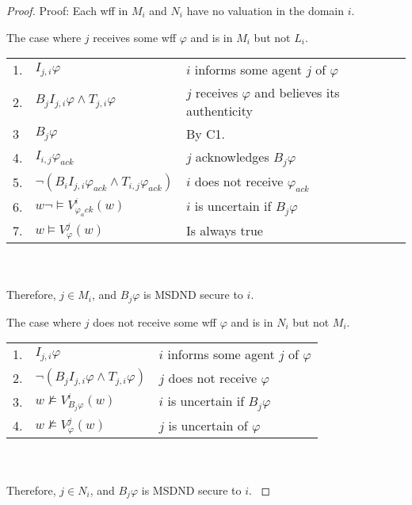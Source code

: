 \begin{proof}
Proof: Each wff in $M_i$ and $N_i$ have no valuation in the domain $i$.

\begin{case}
The case where $j$ receives some wff $\varphi$ and is in $M_i$ but not $L_i$.
\end{case}

\begin{table}[h!]
\centering
\small
\begin{tabularx}{\linewidth}{l l X}
1. & $I_{j,i} \varphi$ & $i$ informs some agent $j$ of $\varphi$ \\
2. & $B_{j}I_{j,i} \varphi \wedge T_{j,i} \varphi$ & $j$ receives $\varphi$ and believes its authenticity \\
3  & $B_j \varphi$ & By C1. \\
4. & $I_{i,j} \varphi_{ack}$ & $j$ acknowledges $B_j \varphi$ \\
5. & $\neg(B_{i}I_{j,i} \varphi_{ack} \wedge T_{i,j} \varphi_{ack})$ & $i$ does not receive $\varphi_{ack}$ \\
6. & $w \neg \vDash V_{\varphi_ack}^{i}(w)$ & $i$ is uncertain if $B_j \varphi$ \\
7. & $w \vDash V_{\varphi}^{j}(w)$ & Is always true %
\end{tabularx} \\~\\
Therefore, $j \in M_i$, and $B_j \varphi$ is MSDND secure to $i$.
\label{tab:msetsecurity}
\end{table}

\begin{case}
The case where $j$ does not receive some wff $\varphi$ and is in $N_i$ but not $M_i$.
\end{case}

\begin{table}[h!]
\centering
\small
\begin{tabularx}{\linewidth}{l l X}
1. & $I_{j,i} \varphi$ & $i$ informs some agent $j$ of $\varphi$ \\
2. & $\neg(B_{j}I_{j,i} \varphi \wedge T_{j,i} \varphi)$ & $j$ does not receive $\varphi$ \\
3. & $w \not \vDash V_{B_j \varphi}^{i}(w)$ & $i$ is uncertain if $B_j \varphi$ \\
4. & $w \not \vDash V_{\varphi}^{j}(w)$ & $j$ is uncertain of $\varphi$ %
\end{tabularx} \\~\\
Therefore, $j \in N_i$, and $B_j \varphi$ is MSDND secure to $i$.
\label{tab:nsetsecurity}
\end{table}
\end{proof}

